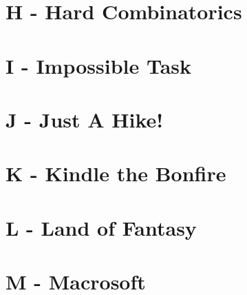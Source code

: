\documentclass{article}
\begin{document}
\section{H - Hard Combinatorics}



\section{I - Impossible Task}



\section{J - Just A Hike!}



\section{K - Kindle the Bonfire}



\section{L - Land of Fantasy}



\section{M - Macrosoft}
\end{document}
